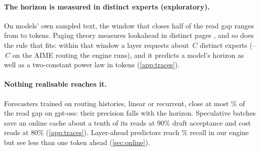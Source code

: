 \paragraph{The horizon is measured in distinct experts (exploratory).} On \fsModels{} models' own sampled text, the
window that closes half of the read gap ranges from \dcWMin{} to \dcWMax{} tokens. Paging theory measures lookahead in
distinct pages \citep{albers1997lookahead,breslauer1995lookahead}, and so does the rule that fits: within that window a
layer requests about \dcMed$\,C$ distinct experts (\dcAimeMin--\dcAimeMax$\,C$ on the AIME routing the engine
runs), and it predicts a model's horizon as well as a two-constant power law in tokens (\cref{app:traces}).

\paragraph{Nothing realisable reaches it.} Forecasters trained on routing histories, linear or recurrent, close at
most \lfShareMaxGpt\% of the read gap on gpt-oss: their precision falls with the horizon. Speculative batches save an
online cache about a tenth of its reads at 90\% draft acceptance and cost reads at 80\%
\citep{spmoe,moespac2026,cascade2025} (\cref{app:traces}). Layer-ahead predictors
\citep{hwang2024pregated,zhu2025preattention} reach \laRecallK\% recall in our engine but see less than one token
ahead (\cref{sec:online}).

